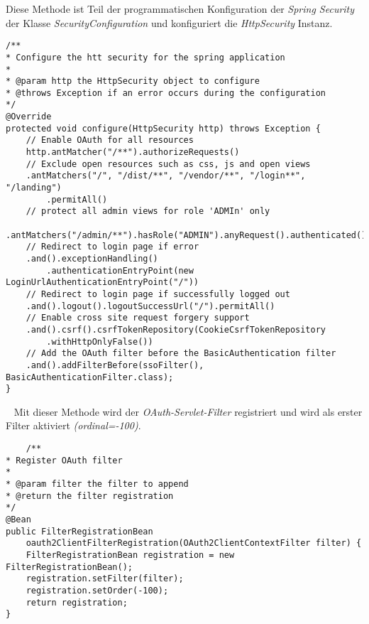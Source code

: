 Diese Methode ist Teil der programmatischen Konfiguration der \emph{Spring Security} der Klasse \emph{SecurityConfiguration} und konfiguriert die \emph{HttpSecurity} Instanz.
\begin{verbatim}
/**
* Configure the htt security for the spring application
*
* @param http the HttpSecurity object to configure
* @throws Exception if an error occurs during the configuration
*/
@Override
protected void configure(HttpSecurity http) throws Exception {
	// Enable OAuth for all resources
	http.antMatcher("/**").authorizeRequests()
	// Exclude open resources such as css, js and open views
	.antMatchers("/", "/dist/**", "/vendor/**", "/login**", "/landing")
		.permitAll()
	// protect all admin views for role 'ADMIn' only
	.antMatchers("/admin/**").hasRole("ADMIN").anyRequest().authenticated()
	// Redirect to login page if error
	.and().exceptionHandling()
		.authenticationEntryPoint(new LoginUrlAuthenticationEntryPoint("/"))
	// Redirect to login page if successfully logged out
	.and().logout().logoutSuccessUrl("/").permitAll()
	// Enable cross site request forgery support
	.and().csrf().csrfTokenRepository(CookieCsrfTokenRepository
		.withHttpOnlyFalse())
	// Add the OAuth filter before the BasicAuthentication filter
	.and().addFilterBefore(ssoFilter(), BasicAuthenticationFilter.class);
}
\end{verbatim}
\ \newline
Mit dieser Methode wird der \emph{OAuth-Servlet-Filter} registriert und wird als erster Filter aktiviert \emph{(ordinal=-100)}.
\begin{verbatim}
    /**
* Register OAuth filter
*
* @param filter the filter to append
* @return the filter registration
*/
@Bean
public FilterRegistrationBean 
	oauth2ClientFilterRegistration(OAuth2ClientContextFilter filter) {
	FilterRegistrationBean registration = new FilterRegistrationBean();
	registration.setFilter(filter);
	registration.setOrder(-100);
	return registration;
}
\end{verbatim}
\ \newpage

